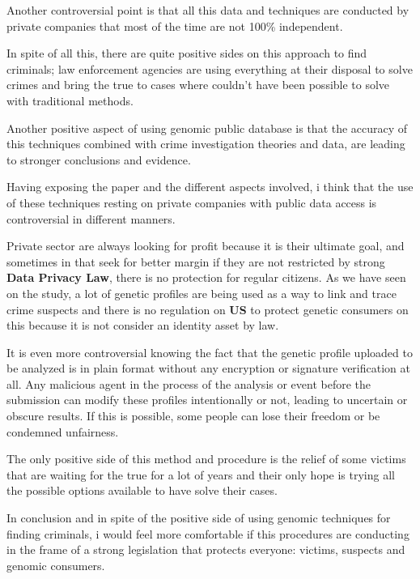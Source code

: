 \documentclass[12pt, a4paper]{article}
\begin{document}
Another controversial point is that all this data and techniques are conducted
by private companies that most of the time are not 100\% independent.

In spite of all this, there are quite positive sides on this approach to find
criminals; law enforcement agencies are using everything at their disposal to
solve crimes and bring the true to cases where couldn't have been possible to
solve with traditional methods.

Another positive aspect of using genomic public database is that the accuracy of
this techniques combined with crime investigation theories and data, are leading to
stronger conclusions and evidence.

Having exposing the paper and the different aspects involved, i think that the
use of these techniques resting on private companies with public data access is
controversial in different manners.

Private sector are always looking for profit because it is their ultimate goal,
and sometimes in that seek for better margin if they are not restricted by
strong \textbf{Data Privacy Law}, there is no protection for regular citizens. As
we have seen on the study, a lot of genetic profiles are being used as a way to
link and trace crime suspects and there is no regulation on \textbf{US} to
protect genetic consumers on this because it is not consider an identity asset by law.

It is even more controversial knowing the fact that the genetic profile uploaded
to be analyzed is in plain format without any encryption or signature
verification at all. Any malicious agent in the process of the analysis or event
before the submission can modify these profiles intentionally or not, leading to
uncertain or obscure results. If this is possible, some people can lose their
freedom or be condemned unfairness. 

The only positive side of this method and procedure is the relief of some
victims that are waiting for the true for a lot of years and their only hope is
trying all the possible options available to have solve their cases.

In conclusion and in spite of the positive side of using genomic techniques for
finding criminals, i would feel more comfortable if this procedures are
conducting in the frame of a strong legislation that protects everyone: victims,
suspects and genomic consumers.
\end{document}
